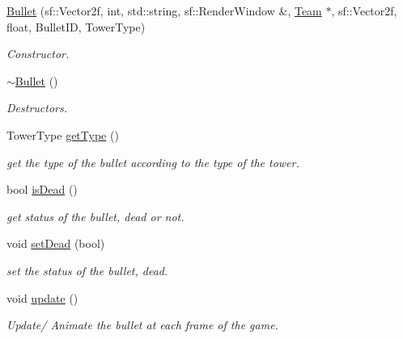 \begin{DoxyCompactItemize}
\item 
\hypertarget{class_bullet_ae7629c8cf31f55714966dfdda6a70518}{\hyperlink{class_bullet_ae7629c8cf31f55714966dfdda6a70518}{Bullet} (sf\+::\+Vector2f, int, std\+::string, sf\+::\+Render\+Window \&, \hyperlink{class_team}{Team} $\ast$, sf\+::\+Vector2f, float, Bullet\+I\+D, Tower\+Type)}\label{class_bullet_ae7629c8cf31f55714966dfdda6a70518}

\begin{DoxyCompactList}\small\item\em Constructor. \end{DoxyCompactList}\item 
\hypertarget{class_bullet_aaeb5cb41d7db89f49007b08b41f1bfcf}{\hyperlink{class_bullet_aaeb5cb41d7db89f49007b08b41f1bfcf}{$\sim$\+Bullet} ()}\label{class_bullet_aaeb5cb41d7db89f49007b08b41f1bfcf}

\begin{DoxyCompactList}\small\item\em Destructors. \end{DoxyCompactList}\item 
\hypertarget{class_bullet_a0df3ff271e346ffe2b33484b8f3e8807}{Tower\+Type \hyperlink{class_bullet_a0df3ff271e346ffe2b33484b8f3e8807}{get\+Type} ()}\label{class_bullet_a0df3ff271e346ffe2b33484b8f3e8807}

\begin{DoxyCompactList}\small\item\em get the type of the bullet according to the type of the tower. \end{DoxyCompactList}\item 
\hypertarget{class_bullet_a4606a3bd0468e2e899c85e2ab5c59b8f}{bool \hyperlink{class_bullet_a4606a3bd0468e2e899c85e2ab5c59b8f}{is\+Dead} ()}\label{class_bullet_a4606a3bd0468e2e899c85e2ab5c59b8f}

\begin{DoxyCompactList}\small\item\em get status of the bullet, dead or not. \end{DoxyCompactList}\item 
\hypertarget{class_bullet_a7215e843d89c05e7d15d0f2db0b320b3}{void \hyperlink{class_bullet_a7215e843d89c05e7d15d0f2db0b320b3}{set\+Dead} (bool)}\label{class_bullet_a7215e843d89c05e7d15d0f2db0b320b3}

\begin{DoxyCompactList}\small\item\em set the status of the bullet, dead. \end{DoxyCompactList}\item 
\hypertarget{class_bullet_a32f4a0611fe2dd245fee955d14ca1f68}{void \hyperlink{class_bullet_a32f4a0611fe2dd245fee955d14ca1f68}{update} ()}\label{class_bullet_a32f4a0611fe2dd245fee955d14ca1f68}

\begin{DoxyCompactList}\small\item\em Update/ Animate the bullet at each frame of the game. \end{DoxyCompactList}\end{DoxyCompactItemize}
